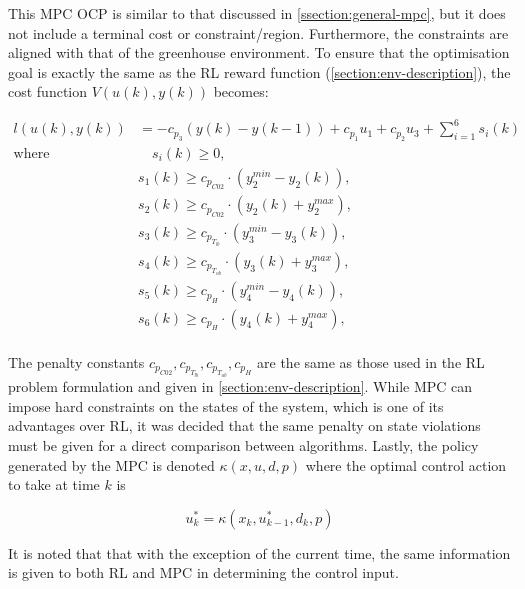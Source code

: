 This MPC OCP is similar to that discussed in \autoref{ssection:general-mpc}, but it does not include a terminal cost or constraint/region. Furthermore, the constraints are aligned with that of the greenhouse environment. To ensure that the optimisation goal is exactly the same as the RL reward function (\autoref{section:env-description}), the cost function $V(u(k),y(k))$ becomes:

\begin{equation} \label{eq:mpc_stage_cost}
	\begin{aligned}
		l(u(k),y(k)) & = - c_{p_3} (y(k) - y(k-1)) + c_{p_1} u_{1} + c_{p_2} u_{3} + \sum_{i = 1}^6 s_i(k) \\
		\text{where} & \quad s_i(k) \geq 0, \\
		& s_1(k) \geq c_{p_{C02}} \cdot (y_2^{min} - y_2(k)), \\ 
		& s_2(k) \geq c_{p_{C02}} \cdot (y_2(k) + y_2^{max}), \\ 
		& s_3(k) \geq c_{p_{T_{lb}}} \cdot (y_3^{min} - y_3(k)), \\ 
		& s_4(k) \geq c_{p_{T_{ub}}} \cdot (y_3(k) + y_3^{max}), \\ 
		& s_5(k) \geq c_{p_{H}} \cdot (y_4^{min} - y_4(k)), \\ 
		& s_6(k) \geq c_{p_{H}} \cdot (y_4(k) + y_4^{max}), \\
	\end{aligned}	
\end{equation}

The penalty constants $c_{p_{C02}},c_{p_{T_{lb}}},c_{p_{T_{ub}}},c_{p_{H}}$ are the same as those used in the RL problem formulation and given in \autoref{section:env-description}. While MPC can impose hard constraints on the states of the system, which is one of its advantages over RL, it was decided that the same penalty on state violations must be given for a direct comparison between algorithms. Lastly, the policy generated by the MPC is denoted $\kappa(x,u,d,p)$ where the optimal control action to take at time $k$ is

\begin{equation}\label{eq:mpc_policy_notation}
	u_k^* = \kappa(x_k,u_{k-1}^*, d_k, p)
\end{equation}

It is noted that that with the exception of the current time, the same information is given to both RL and MPC in determining the control input.

